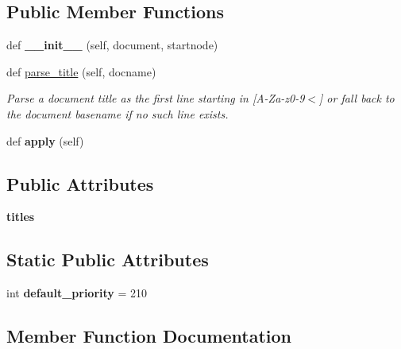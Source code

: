 \subsection*{Public Member Functions}
\begin{DoxyCompactItemize}
\item 
\mbox{\label{classcmake_1_1CMakeTransform_ac0c3ca6417777d94072b73cc31fceb5a}} 
def {\bfseries \+\_\+\+\_\+init\+\_\+\+\_\+} (self, document, startnode)
\item 
def \hyperlink{classcmake_1_1CMakeTransform_aef2cd6c122395c8dd8c8a9a43c89be80}{parse\+\_\+title} (self, docname)
\begin{DoxyCompactList}\small\item\em Parse a document title as the first line starting in \mbox{[}A-\/\+Za-\/z0-\/9$<$\mbox{]} or fall back to the document basename if no such line exists. \end{DoxyCompactList}\item 
\mbox{\label{classcmake_1_1CMakeTransform_ae75d969103bcd104f698ffe8bd764f9a}} 
def {\bfseries apply} (self)
\end{DoxyCompactItemize}
\subsection*{Public Attributes}
\begin{DoxyCompactItemize}
\item 
\mbox{\label{classcmake_1_1CMakeTransform_a56d0ad5b508226202714d62125477210}} 
{\bfseries titles}
\end{DoxyCompactItemize}
\subsection*{Static Public Attributes}
\begin{DoxyCompactItemize}
\item 
\mbox{\label{classcmake_1_1CMakeTransform_ab5ae6cbdeb04d51d6bacbc516a27df80}} 
int {\bfseries default\+\_\+priority} = 210
\end{DoxyCompactItemize}


\subsection{Member Function Documentation}
\mbox{\label{classcmake_1_1CMakeTransform_aef2cd6c122395c8dd8c8a9a43c89be80}} 
